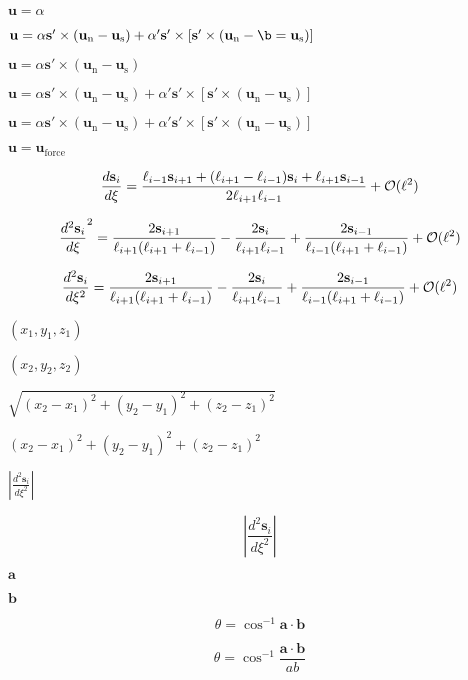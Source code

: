 \documentclass{article}
\begin{document}
$\mathbf{u}=\alpha $
\pagebreak

$\mathbf{u}=\alpha \mathbf{s}' \times (\mathbf{u}_\mathrm{n}-\mathbf{u}_\mathrm{s})+\alpha' \mathbf{s}' \times \left[ \mathbf{s}' \times (\mathbf{u}_\mathrm{n}-\b=\mathbf{u}_\mathrm{s})\right]$
\pagebreak

$\mathbf{u}=\alpha \mathbf{s}' \times (\mathbf{u}_\mathrm{n}-\mathbf{u}_\mathrm{s})$
\pagebreak

$\mathbf{u}=\alpha \mathbf{s}' \times (\mathbf{u}_\mathrm{n}-\mathbf{u}_\mathrm{s})+\alpha' \mathbf{s}' \times [\mathbf{s}' \times (\mathbf{u}_\mathrm{n}-\mathbf{u}_\mathrm{s})]$
\pagebreak

$\mathbf{u}=\alpha \mathbf{s}' \times (\mathbf{u}_\mathrm{n}-\mathbf{u}_\mathrm{s})+ \alpha' \mathbf{s}' \times [\mathbf{s}' \times (\mathbf{u}_\mathrm{n}-\mathbf{u}_\mathrm{s})]$
\pagebreak

$\mathbf{u}=\mathbf{u}_\mathrm{force}$
\pagebreak

\[ \frac{d \mathbf{s}_i}{d \xi}=\frac{\ell_{i-1}\mathbf{s}_{i+1}+(\ell_{i+1}-\ell_{i-1})\mathbf{s}_i+\ell_{i+1}\mathbf{s}_{i-1}} {2\ell_{i+1}\ell_{i-1}}+{\cal O}(\ell^2) \]
\pagebreak

\[ \frac{d^2 \mathbf{s}_i}{d \xi}^2=\frac{2\mathbf{s}_{i+1}}{\ell_{i+1}(\ell_{i+1}+\ell_{i- 1})}- \frac{2\mathbf{s}_i}{\ell_{i+1}\ell_{i-1}}+\frac{2\mathbf{s}_{i-1}}{\ell_{i-1}(\ell_{i+ 1}+\ell_{i-1})}+{\cal O}(\ell^2) \]
\pagebreak

\[ \frac{d^2 \mathbf{s}_i}{d \xi^2}=\frac{2\mathbf{s}_{i+1}}{\ell_{i+1}(\ell_{i+1}+\ell_{i- 1})}- \frac{2\mathbf{s}_i}{\ell_{i+1}\ell_{i-1}}+\frac{2\mathbf{s}_{i-1}}{\ell_{i-1}(\ell_{i+ 1}+\ell_{i-1})}+{\cal O}(\ell^2) \]
\pagebreak

$(x_1,y_1,z_1)$
\pagebreak

$(x_2,y_2,z_2)$
\pagebreak

$\sqrt{(x_2-x_1)^2+(y_2-y_1)^2+(z_2-z_1)^2}$
\pagebreak

${(x_2-x_1)^2+(y_2-y_1)^2+(z_2-z_1)^2}$
\pagebreak

$|\frac{d^2 \mathbf{s}_i}{d \xi^2}|$
\pagebreak

\[|\frac{d^2 \mathbf{s}_i}{d \xi^2}|\]
\pagebreak

$\mathbf{a}$
\pagebreak

$\mathbf{b}$
\pagebreak

\[ \theta=\cos^{-1} \mathbf{a} \cdot \mathbf{b} \]
\pagebreak

\[ \theta=\cos^{-1} \frac{ \mathbf{a} \cdot \mathbf{b}}{ab} \]
\pagebreak
\end{document}
